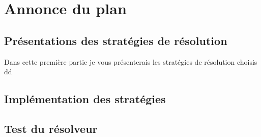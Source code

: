 \hypertarget{Annonce du plan}{%
\section{Annonce du plan}\label{annonce du plan}}

\subsection{Présentations des stratégies de résolution}

Dans cette première partie je vous présenterais les stratégies de résolution choisis dd
\subsection{Implémentation des stratégies}

\subsection{Test du résolveur}
